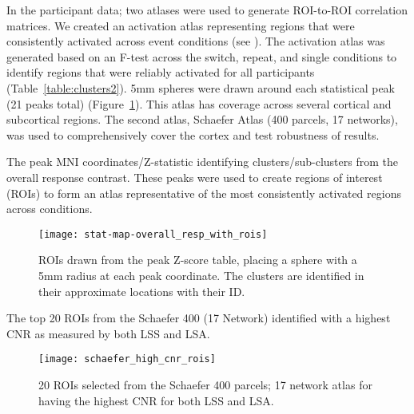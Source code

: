 \documentclass[phd,figures,tables,ackpage,abstractpage,publicabstractpage]{uithesis}
\begin{document}
In the participant data; two atlases were used to generate ROI-to-ROI correlation matrices.
We created an activation atlas representing regions that were
consistently activated across event conditions (see ).
The activation atlas was generated based on an F-test across the switch, repeat, and single conditions
to identify regions that were reliably activated for all participants (Table~\ref{table:clusters2}).
5mm spheres were drawn around each statistical peak (21 peaks total) (Figure~\ref{fig:methroimap2}).
This atlas has coverage across several cortical and subcortical regions.
The second atlas, Schaefer Atlas (400 parcels, 17 networks)\cite{Schaefer2017}, was
used to comprehensively cover the cortex and test robustness of results.


\begin{table}[H]
  \caption{
    The peak MNI coordinates/Z-statistic identifying clusters/sub-clusters from the overall
    response contrast.
    These peaks were used to create regions of interest (ROIs) to form an atlas representative
    of the most consistently activated regions across conditions.
  }
  \label{table:clusters2}
\end{table}

\begin{figure}[H]
  \centering
  \texttt{[image: stat-map-overall\_resp\_with\_rois]}
  \caption[Activation Atlas]{
    ROIs drawn from the peak Z-score table, placing a sphere with a 5mm radius
    at each peak coordinate.
    The clusters are identified in their approximate locations
    with their ID.
  }
  \label{fig:methroimap2}
\end{figure}

\begin{table}[H]
  \caption{
    The top 20 ROIs from the Schaefer 400 (17 Network) identified with a highest CNR as measured by
    both LSS and LSA.
  }
  \label{table:parcels2}
\end{table}

\begin{figure}[H]
  \centering
  \texttt{[image: schaefer\_high\_cnr\_rois]}
  \caption[SchaeferTop20 Atlas]{
    20 ROIs selected from the Schaefer 400 parcels; 17 network atlas for having the
    highest CNR for both LSS and LSA.
  }
  \label{fig:schaefertopmap2}
\end{figure}
\end{document}
